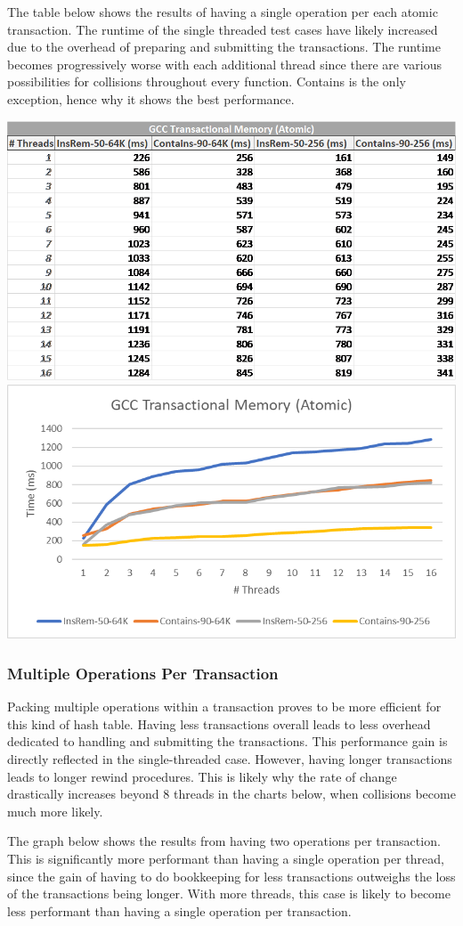 \documentclass[11pt]{article} %
\begin{document}
The table below shows the results of having a single operation per each atomic transaction. The runtime of the single threaded test cases have likely increased due to the overhead of preparing and submitting the transactions. The runtime becomes progressively worse with each additional thread since there are various possibilities for collisions throughout every function. Contains is the only exception, hence why it shows the best performance.

\bigskip
\includegraphics[width=0.5\linewidth]{Table1.png}
\includegraphics[width=0.5\linewidth]{Graph1.png}

\subsubsection{Multiple Operations Per Transaction}

Packing multiple operations within a transaction proves to be more efficient for this kind of hash table. Having less transactions overall leads to less overhead dedicated to handling and submitting the transactions. This performance gain is directly reflected in the single-threaded case. However, having longer transactions leads to longer rewind procedures. This is likely why the rate of change drastically increases beyond 8 threads in the charts below, when collisions become much more likely.

The graph below shows the results from having two operations per transaction. This is significantly more performant than having a single operation per thread, since the gain of having to do bookkeeping for less transactions outweighs the loss of the transactions being longer. With more threads, this case is likely to become less performant than having a single operation per transaction.
\end{document}
